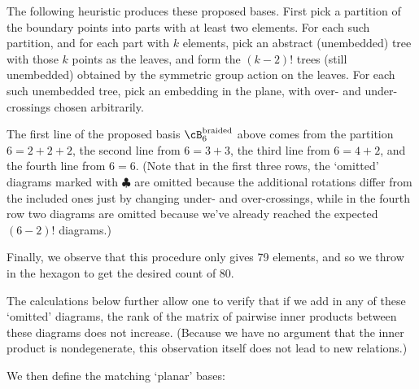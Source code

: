 \documentclass[12pt]{amsart}
\begin{document}
The following heuristic produces these proposed bases. First pick a partition of the boundary points
into parts with at least two elements. For each such partition, and for each part with $k$ elements, pick an abstract (unembedded) tree with those
$k$ points as the leaves, and form the $(k-2)!$ trees (still unembedded) obtained by the symmetric group action on the leaves.  For each such unembedded tree, pick an embedding in the plane, with over- and under-crossings chosen arbitrarily.

The first line of the proposed basis $\cB^{\text{braided}}_6$ above comes from the partition $6=2+2+2$,
the second line from $6=3+3$, the third line from $6=4+2$, and the fourth line from $6=6$.
(Note that in the first three rows, the `omitted' diagrams marked with $\clubsuit$ are omitted because the additional rotations differ from the included ones just by changing under- and over-crossings, while in the fourth row two diagrams are omitted because we've already reached the expected $(6-2)!$ diagrams.)

Finally, we observe that this procedure only gives 79 elements, and so we throw in the hexagon to get the desired
count of 80.

The calculations below further allow one to verify that if we add in any of these `omitted' diagrams, the rank of the matrix of pairwise inner products between these diagrams does not increase. (Because we have no argument that the
inner product is nondegenerate, this observation itself does not lead to new relations.)

We then define the matching `planar' bases:
\end{document}
